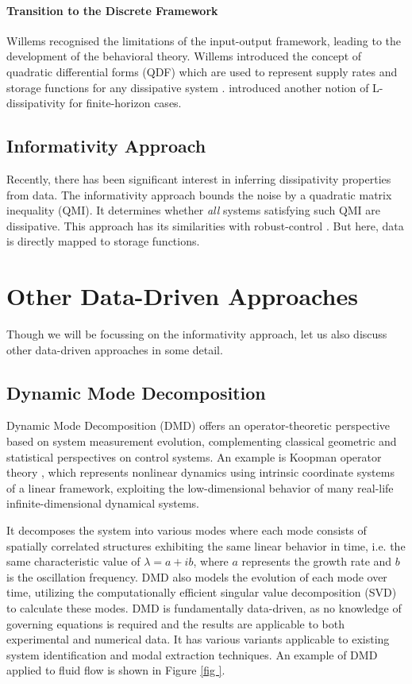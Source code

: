 \paragraph{Transition to the Discrete Framework}
Willems recognised the limitations of the input-output framework, leading to the development of the behavioral theory. Willems introduced the concept of quadratic differential forms (QDF) which are used to represent supply rates and storage functions for any dissipative system \cite{Trentelman1997}. \cite{Maupong2017} introduced another notion of L-dissipativity for finite-horizon cases.

\subsection{Informativity Approach}
Recently, there has been significant interest in inferring dissipativity properties from data.
The informativity approach bounds the noise by a quadratic matrix inequality (QMI). It determines whether \emph{all} systems satisfying such QMI are dissipative. This approach has its similarities with robust-control \cite{Megretski1997, Iwasaki1998, Scherer1997,Scherer2001}. But here, data is directly mapped to storage functions. 
\section{Other Data-Driven Approaches}
Though we will be focussing on the informativity approach, let us also discuss other data-driven approaches in some detail.
\subsection{Dynamic Mode Decomposition}

Dynamic Mode Decomposition (DMD) offers an operator-theoretic perspective based on system measurement evolution, complementing classical geometric and statistical perspectives on control systems. An example is Koopman operator theory \cite{brunton2021modern}, which represents nonlinear dynamics using intrinsic coordinate systems of a linear framework, exploiting the low-dimensional behavior of many real-life infinite-dimensional dynamical systems.

It decomposes the system into various modes where each mode consists of spatially correlated structures exhibiting the same linear behavior in time, i.e. the same characteristic value of $\lambda = a + ib$, where $a$ represents the growth rate and $b$ is the oscillation frequency. DMD also models the evolution of each mode over time, utilizing the computationally efficient singular value decomposition (SVD) to calculate these modes. DMD is fundamentally data-driven, as no knowledge of governing equations is required and the results are applicable to both experimental and numerical data. It has various variants applicable to existing system identification and modal extraction techniques. An example of DMD applied to fluid flow is shown in Figure \ref{fig
}.

